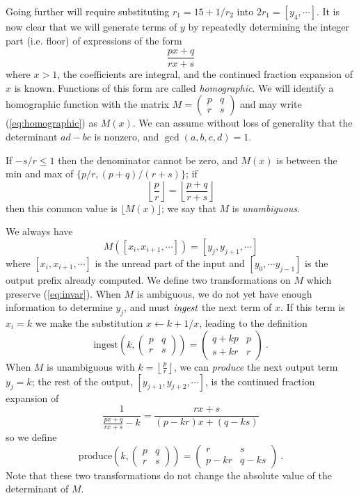 \documentclass[11pt, oneside]{amsart}   	%
\newcommand{\pqrs}{\left(
\begin{smallmatrix} 
p & q\\ 
r & s 
\end{smallmatrix}
\right)}
\newcommand{\homographic}[4]{\begin{pmatrix} #1 & #2\\ #3 & #4 \end{pmatrix}}
\renewcommand{\:}{\negthickspace:\negthickspace}
\begin{document}
Going further will require substituting $r_1 = 15+1/r_2$ into $2r_1 = [y_4,\cdots]$.
It is now clear that we will generate terms of $y$ by repeatedly determining the integer part (i.e. floor) of expressions of the form
\begin{equation}\label{eq:homographic}
\frac{px+q}{rx+s}
\end{equation}
where $x > 1$, the coefficients are integral, and the continued fraction expansion of $x$ is known. Functions of this form are called \emph{homographic}.
We will identify a homographic function with the matrix
$M=\left(
\begin{smallmatrix} 
p & q\\ 
r & s 
\end{smallmatrix}
\right)$
and may write (\ref{eq:homographic}) as $M(x)$. We can assume without loss of generality that the determinant $ad-bc$ is nonzero, and $\gcd(a,b,c,d)=1$.

If $-s/r \leq 1$ then the denominator cannot be zero, and $M(x)$ is between the min and max of $\{p/r, (p+q)/(r+s)\}$; if
\[
\left\lfloor \frac{p}{r}\right\rfloor = \left\lfloor \frac{p+q}{r+s}\right\rfloor
\]
then this common value is $\lfloor M(x) \rfloor$; we say that $M$ is \emph{unambiguous}.


We always have
\begin{equation}\label{eq:invar}
M([x_i,x_{i+1},\cdots]) = [y_j,y_{j+1},\cdots]
\end{equation}
where $[x_i,x_{i+1},\cdots]$ is the unread part of the input and $[y_0,\cdots y_{j-1}]$ is the output prefix already computed. 
We define two transformations on $M$ which preserve (\ref{eq:invar}). When $M$ is ambiguous, we do not yet have enough information to determine $y_j$, and must $\emph{ingest}$ the next term of $x$. If this term is $x_i=k$ we make the substitution $x \leftarrow k + 1/x$, leading to the definition
\[
\mbox{ingest}(k,\pqrs) = \homographic{q+kp}{p}{s+kr}{r}\ .%
\]
When $M$ is unambiguous with $k=\left\lfloor \frac{p}{r}\right\rfloor$, we can \emph{produce}
the next output term $y_j = k$; the rest of the output, $[y_{j+1},y_{j+2},\cdots]$, is the continued fraction expansion of
\[
\frac{1}{\frac{px+q}{rx+s}-k} = \frac{rx+s}{(p-kr)x + (q-ks)}
\] 
so we define 
\[
\mbox{produce}(k,\pqrs) = \homographic{r}{s}{p-kr}{q-ks}\ .
\]
Note that these two transformations do not change the absolute value of the determinant of $M$.
\end{document}
